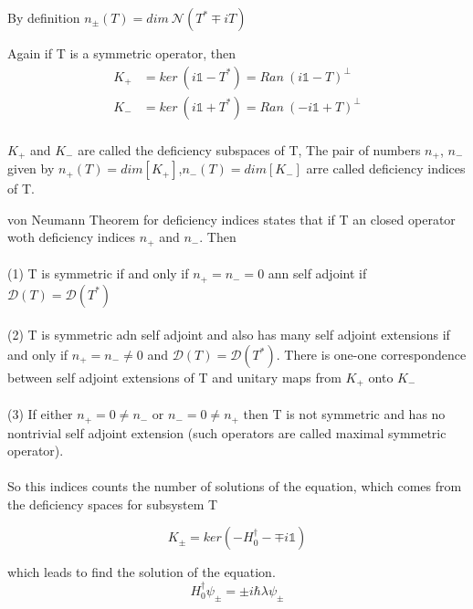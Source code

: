 \documentclass[12pt]{report}
\newcommand*{\1}{\hspace{1pt}}
\begin{document}
        By definition $n_{\pm} (T) = dim \ \mathcal{N}(T^{*} \mp iT )$ 

        Again if T is a symmetric operator, then
        \begin{equation}
            \begin{split}
                K_{+} &= ker \ (i\mathds{1}-T^{*}) = Ran \ (i\mathds{1} - T) ^{\perp} \\
                K_{-} &= ker \ (i \mathds{1} +T^{*}) = Ran \ (-i\mathds{1} + T) ^{\perp} \\ 
            \end{split}
        \end{equation}
        
        $K_{+}$ and $K_{-}$ are called the deficiency subspaces of T, The pair of numbers $n_{+}$, $n_{-}$ given by $n_{+}(T) = dim[K_{+}]$,$n_{-}(T) = dim[K_{-}]$ arre called
        deficiency indices of T.

        von Neumann Theorem for deficiency indices states that if T an closed operator woth deficiency indices $n_{+}$ and $n_{-}$. Then \\ 
        \\
         (1) T is symmetric if and only if $n_{+} = n_{-} = 0$ ann self adjoint if $\mathcal{D}(T)=\mathcal{D}(T^{*})$ \\ 
         \\ 
         (2) T is symmetric adn self adjoint and also has many self adjoint extensions if and only if $n_{+}=n_{-}\neq 0$ and  $\mathcal{D}(T)=\mathcal{D}(T^{*})$.
         There is one-one correspondence between self adjoint extensions of T and unitary maps from $K_{+}$ onto $K_{-}$ \\ 
         \\ 
         (3) If either $n_{+}=0 \neq n_{-}$ or $n_{-}=0 \neq n_{+}$ then T is not symmetric and has no nontrivial self adjoint extension (such operators are called 
         maximal symmetric operator). \\
         \\
        So this indices counts the number of solutions of the equation, which comes from the deficiency spaces for subsystem T

        \begin{equation}
            K_{\pm} = ker \left(-H_{0}^{\dagger} - \mp i \mathds{1}\right)
        \end{equation}

        which leads to find the solution of the equation.
        \begin{equation}
            H_{0} ^{\dagger} \psi_{\pm} = \pm i \hbar \lambda \psi_{\pm}
        \end{equation}
\end{document}
